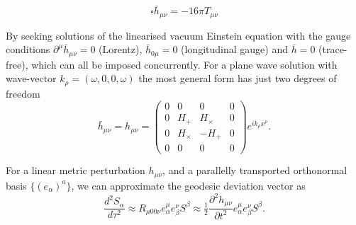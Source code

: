 \documentclass[12pt]{article}
\begin{document}
\begin{noteEquation}
	\begin{equation}
		\square \bar{h}_{\mu\nu} = -16 \pi T_{\mu\nu}
	\end{equation}
\end{noteEquation}

\begin{noteEquation}
	By seeking solutions of the linearised vacuum Einstein equation with the gauge conditions $\partial^\mu \bar{h}_{\mu\nu} = 0$ (Lorentz), $\bar{h}_{0\mu} = 0$ (longitudinal gauge) and $\bar{h} = 0$ (trace-free), which can all be imposed concurrently. For a plane wave solution with wave-vector $k_\rho = (\omega, 0, 0, \omega)$ the most general form has just two degrees of freedom
		\begin{equation}
			\bar{h}_{\mu\nu} = h_{\mu\nu} = \begin{pmatrix}
				0&0&0&0 \\ 
				0 & H_+ 	 & 	H_\times & 0 \\ 
				0 & H_\times & - H_+ 	 & 0 \\ 
				0&0&0&0
			\end{pmatrix} e^{i k_\rho x^\rho}.
		\end{equation}
\end{noteEquation}

\begin{noteEquation}
	For a linear metric perturbation $h_{\mu\nu}$, and a parallelly transported orthonormal basis $\{(e_\alpha)^a\}$, we can approximate the geodesic deviation vector as
		\begin{equation}
			\frac{d^2 S_\alpha}{d \tau^2} \approx R_{\mu 0 0 \nu} e^\mu_\alpha e^\nu_\beta S^\beta \approx \tfrac{1}{2} \frac{\partial^2 h_{\mu\nu}}{\partial t^2} e^\mu_\alpha e^\nu_\beta S^\beta.
		\end{equation}
\end{noteEquation}
\end{document}

